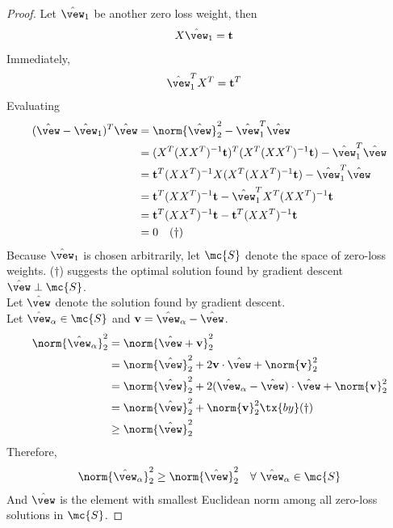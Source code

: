 \documentclass{article}
\begin{document}
	\begin{proof}
		Let $\hat{\vew}_1$ be another zero loss weight, then
		\begin{align}
			X \hat{\vew}_1 &= \textbf{t}
		\end{align}
		Immediately,
		\begin{align}
			\hat{\vew}_1^T X^T &= \textbf{t}^T
		\end{align}
		Evaluating
		\begin{align}
			(\hat{\vew} - \hat{\vew}_1)^T \hat{\vew} &= \norm{\hat{\vew}}^2_2 - \hat{\vew}_1^T \hat{\vew} \\
			&= (X^T (XX^T)^{-1} \textbf{t})^T
			(X^T (XX^T)^{-1} \textbf{t})
			- \hat{\vew}_1^T \hat{\vew} \\
			&= \textbf{t}^T (XX^T)^{-1} X (X^T (XX^T)^{-1} \textbf{t})
			- \hat{\vew}_1^T \hat{\vew} \\
			&= \textbf{t}^T (XX^T)^{-1} \textbf{t}
			- \hat{\vew}_1^T X^T (XX^T)^{-1} \textbf{t} \\
			&= \textbf{t}^T (XX^T)^{-1} \textbf{t}
			- \textbf{t}^T (XX^T)^{-1} \textbf{t} \\
			&= 0\quad (\dagger)
		\end{align}
		Because $\hat{\vew}_1$ is chosen arbitrarily, let $\mc{S}$ denote the space of zero-loss weights. ($\dagger$) suggests the optimal solution found by gradient descent $\hat{\vew} \perp \mc{S}$. \\
		Let $\hat{\vew}$ denote the solution found by gradient descent. \\
		Let $\hat{\vew}_\alpha \in \mc{S}$ and $\textbf{v} = \hat{\vew}_\alpha - \hat{\vew}$.
		\begin{align}
			\norm{\hat{\vew}_\alpha}_2^2 &= \norm{\hat{\vew} + \textbf{v}}_2^2 \\
			&= \norm{\hat{\vew}}_2^2 + 2 \textbf{v} \cdot \hat{\vew} + \norm{\textbf{v}}_2^2 \\
			&= \norm{\hat{\vew}}_2^2 + 2 (\hat{\vew}_\alpha - \hat{\vew}) \cdot \hat{\vew} + \norm{\textbf{v}}_2^2 \\
			&= \norm{\hat{\vew}}_2^2 + \norm{\textbf{v}}_2^2 \tx{ by }(\dagger) \\
			&\geq \norm{\hat{\vew}}_2^2
		\end{align}
		Therefore,
		\begin{align}
			\norm{\hat{\vew}_\alpha}_2^2 \geq \norm{\hat{\vew}}_2^2\quad \forall\ \hat{\vew}_\alpha \in \mc{S}
		\end{align}
		And $\hat{\vew}$ is the element with smallest Euclidean norm among all zero-loss solutions in $\mc{S}$.
	\end{proof}
	
\end{document}
